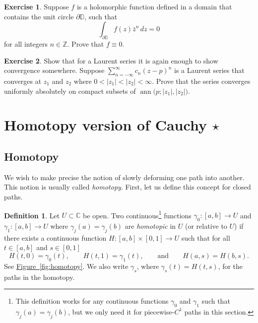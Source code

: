 \documentclass[12pt,openany]{book}
\newcommand{\ann}{\operatorname{ann}}
\newcommand{\sabs}[1]{\lvert {#1} \rvert}
\newcommand{\C}{{\mathbb{C}}}
\newcommand{\Z}{{\mathbb{Z}}}
\newcommand{\D}{{\mathbb{D}}}
\newcommand{\myindex}[1]{#1\index{#1}}
\theoremstyle{plain}
\theoremstyle{remark}
\theoremstyle{definition}
\newtheorem{defn}[thm]{Definition}
\newenvironment{exbox}{%
    \def\FrameCommand{\vrule width 1pt \relax\hspace{10pt}}%
    \MakeFramed{\advance\hsize-\width\FrameRestore}%
}{%
    \endMakeFramed
}
\theoremstyle{exercise}
\newtheorem{exercise}{Exercise}[section]
\theoremstyle{example}
\newcommand{\figureref}[1]{\hyperref[#1]{Figure~\ref*{#1}}}
\begin{document}
\begin{exbox}
\begin{exercise}
Suppose $f$ is a holomorphic function defined in a domain that contains
the unit circle $\partial \D$, such that
\begin{equation*}
\int_{\partial \D} f(z)\bar{z}^n
 \, dz = 0
\end{equation*}
for all integers $n \in \Z$.  Prove that $f \equiv 0$.
\end{exercise}

\begin{exercise}
Show that for a Laurent series it is again enough to show convergence
somewhere.  Suppose $\sum_{n=-\infty}^\infty c_n {(z-p)}^n$ is a Laurent
series that converges at $z_1$ and $z_2$ where
$0 < \sabs{z_1} < \sabs{z_2} < \infty$.
Prove that the series converges uniformly absolutely on compact subsets
of $\ann\bigl(p;\sabs{z_1},\sabs{z_2}\bigr)$.
\end{exercise}
\end{exbox}


\section{Homotopy version of Cauchy \texorpdfstring{$\star$}{*}}

\subsection{Homotopy}

We wish to make precise the notion of slowly deforming one path into
another.  This notion is usually called \emph{\myindex{homotopy}}.
First, let us define this concept for closed paths.

\begin{defn}\label{defn:homotopy}
Let $U \subset \C$ be open.
Two continuous\footnote{This definition
works for any continuous functions $\gamma_0$ and $\gamma_1$ such that
$\gamma_j(a)=\gamma_j(b)$, but we only need it for piecewise-$C^1$ paths in
this section.} functions
$\gamma_0 \colon [a,b] \to U$ and
$\gamma_1 \colon [a,b] \to U$
where $\gamma_j(a)=\gamma_j(b)$
are \emph{\myindex{homotopic}} in $U$
(or relative to $U$) if there exists a continuous function
$H \colon [a,b] \times [0,1] \to U$ such that
for all $t \in [a,b]$ and $s \in [0,1]$
\begin{equation*}
H(t,0) = \gamma_0(t), \qquad
H(t,1) = \gamma_1(t), \qquad \text{and} \qquad
H(a,s) = H(b,s) .
\end{equation*}
See \figureref{fig:homotopy}.
We also write $\gamma_s$, where $\gamma_s(t) = H(t,s)$, for the paths in the homotopy.
\end{defn}
\end{document}
